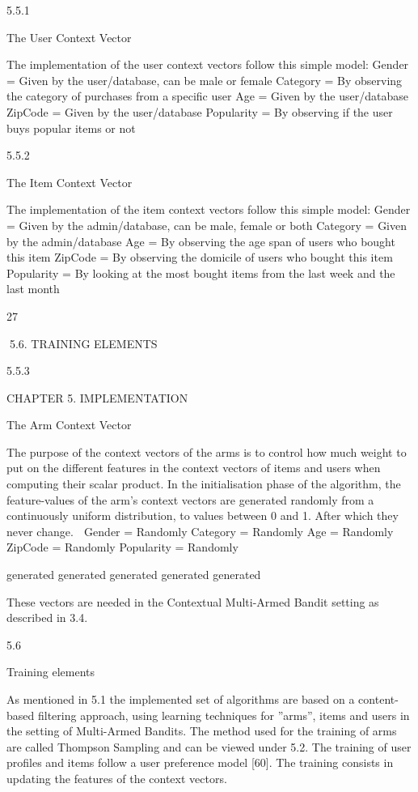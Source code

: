 5.5.1

The User Context Vector

The implementation of the user context vectors follow this simple model:
Gender = Given by the user/database, can be male or female
Category = By observing the category of purchases from a specific user
Age = Given by the user/database
ZipCode = Given by the user/database
Popularity = By observing if the user buys popular items or not

5.5.2

The Item Context Vector

The implementation of the item context vectors follow this simple model:
Gender = Given by the admin/database, can be male, female or both
Category = Given by the admin/database
Age = By observing the age span of users who bought this item
ZipCode = By observing the domicile of users who bought this item
Popularity = By looking at the most bought items from the last week and the last month

27

5.6. TRAINING ELEMENTS

5.5.3

CHAPTER 5. IMPLEMENTATION

The Arm Context Vector

The purpose of the context vectors of the arms is to control how much weight to put
on the different features in the context vectors of items and users when computing their
scalar product. In the initialisation phase of the algorithm, the feature-values of the
arm’s context vectors are generated randomly from a continuously uniform distribution,
to values between 0 and 1. After which they never change.

Gender = Randomly
Category = Randomly
Age = Randomly
ZipCode = Randomly
Popularity = Randomly

generated
generated
generated
generated
generated

These vectors are needed in the Contextual Multi-Armed Bandit setting as described in
3.4.

5.6

Training elements

As mentioned in 5.1 the implemented set of algorithms are based on a content-based
filtering approach, using learning techniques for ”arms”, items and users in the setting of
Multi-Armed Bandits. The method used for the training of arms are called Thompson
Sampling and can be viewed under 5.2. The training of user profiles and items follow a
user preference model [60]. The training consists in updating the features of the context
vectors.

